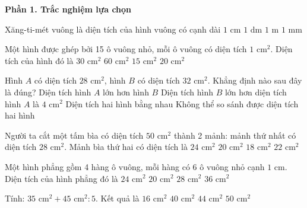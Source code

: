 \textbf{Phần 1. Trắc nghiệm lựa chọn}

\begin{ex} %
Xăng-ti-mét vuông là diện tích của hình vuông có cạnh dài
\choice
{\True $1\text{ cm}$}
{$1\text{ dm}$}
{$1\text{ m}$}
{$1\text{ mm}$}
\end{ex}

\begin{ex} %
Một hình được ghép bởi 15 ô vuông nhỏ, mỗi ô vuông có diện tích $1\text{ cm}^2$. Diện tích của hình đó là
\choice
{$30\text{ cm}^2$}
{$60\text{ cm}^2$}
{\True $15\text{ cm}^2$}
{$20\text{ cm}^2$}
\end{ex}

\begin{ex} %
Hình $A$ có diện tích $28\text{ cm}^2$, hình $B$ có diện tích $32\text{ cm}^2$. Khẳng định nào sau đây là đúng?
\choice
{Diện tích hình $A$ lớn hơn hình $B$}
{\True Diện tích hình $B$ lớn hơn diện tích hình $A$ là $4\text{ cm}^2$}
{Diện tích hai hình bằng nhau}
{Không thể so sánh được diện tích hai hình}
\end{ex}

\begin{ex} %
Người ta cắt một tấm bìa có diện tích $50\text{ cm}^2$ thành 2 mảnh: mảnh thứ nhất có diện tích $28\text{ cm}^2$. Mảnh bìa thứ hai có diện tích là
\choice
{$24\text{ cm}^2$}
{$20\text{ cm}^2$}
{$18\text{ cm}^2$}
{\True $22\text{ cm}^2$}
\end{ex}

\begin{ex} %
Một hình phẳng gồm 4 hàng ô vuông, mỗi hàng có 6 ô vuông nhỏ cạnh $1\text{ cm}$. Diện tích của hình phẳng đó là
\choice
{\True $24\text{ cm}^2$}
{$20\text{ cm}^2$}
{$28\text{ cm}^2$}
{$36\text{ cm}^2$}
\end{ex}

\begin{ex} %
Tính: $35\text{ cm}^2 + 45\text{ cm}^2 : 5$. Kết quả là
\choice
{$16\text{ cm}^2$}
{$40\text{ cm}^2$}
{\True $44\text{ cm}^2$}
{$50\text{ cm}^2$}
\end{ex}

